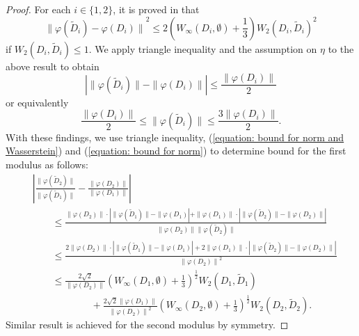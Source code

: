 \documentclass[sn-mathphys-num]{sn-jnl}%
\theoremstyle{thmstyleone}%
\theoremstyle{thmstyletwo}%
\theoremstyle{thmstylethree}%
\begin{document}
\begin{proof}
	For each $i \in\{1,2\}$, it is proved in \cite{Bubenik_1} that
	\begin{equation}\label{equation: bound for norm and Wasserstein}
		{\|\varphi(\tilde{D}_i)-\varphi(D_i)\|}^2 \leq 2\left(W_{\infty}(D_i, \emptyset)+\frac{1}{3}\right) {W_2(D_i, \tilde{D}_i)}^2
	\end{equation}
	if $W_2(D_i, \tilde{D}_i) \leq 1$. We apply triangle inequality and the assumption on $\eta$ to the above result to obtain
	\begin{equation*}
		\left|\|\varphi(\tilde{D}_i)\|-\|\varphi(D_i)\|\right| \leq \frac{\|\varphi(D_i)\|}{2}
	\end{equation*}
	or equivalently
	\begin{equation}\label{equation: bound for norm}
		\frac{\|\varphi(D_i)\|}{2} \leq\|\varphi(\tilde{D}_i)\| \leq \frac{3\left\|\varphi(D_i)\right\|}{2}.
	\end{equation}
	With these findings, we use triangle inequality, (\ref{equation: bound for norm and Wasserstein}) and (\ref{equation: bound for norm}) to determine bound for the first modulus as follows:
	\begin{align*}
		&\left|\frac{\|\varphi(\tilde{D}_2)\|}{\|\varphi(\tilde{D}_1)\|}-\frac{\|\varphi(D_2)\|}{\|\varphi(D_1)\|}\right| \\
		&\qquad \leq \frac{\|\varphi(D_2)\| \cdot\left|\|\varphi(\tilde{D}_1)\|-\|\varphi(D_1)\right|+\|\varphi(D_1)\| \cdot\left|\|\varphi(\tilde{D}_2)\|-\|\varphi(D_2)\| \right|}{\|\varphi(D_2)\|\|\varphi(\tilde{D}_2)\|} \\
		& \qquad \leq \frac{2\left\|\varphi(D_2)\right\| \cdot\left|\|\varphi(\tilde{D}_1)\|-\|\varphi(D_1)\right|+2\left\|\varphi(D_1)\right\| \cdot\left|\|\varphi(\tilde{D}_2)\|-\|\varphi(D_2)\| \right|}{{\|\varphi(D_2)\|}^2} \\
		& \qquad \leq \frac{2\sqrt{2}}{\|\varphi(D_2)\|}\left(W_{\infty}(D_1, \emptyset)+\frac{1}{3}\right)^{\frac{1}{2}} W_2(D_1, \tilde{D}_1)\\
		& \qquad \qquad \qquad + 
		\frac{2\sqrt{2}\left\|\varphi(D_1)\right\|}{{\|\varphi(D_2)\|}^2}\left(W_{\infty}(D_2, \emptyset)+\frac{1}{3}\right)^{\frac{1}{2}} W_2(D_2, \tilde{D}_2).
	\end{align*}
	Similar result is achieved for the second modulus by symmetry.
	

\end{proof}
\end{document}
